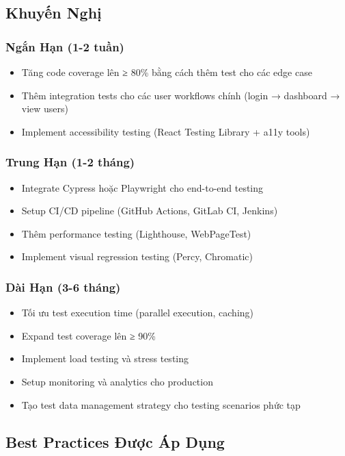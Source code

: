 \documentclass[12pt,a4paper,vietnamese]{article}
\begin{document}
\subsection{Khuyến Nghị}

\subsubsection{Ngắn Hạn (1-2 tuần)}
\begin{itemize}
    \item Tăng code coverage lên ≥ 80\% bằng cách thêm test cho các edge case
    \item Thêm integration tests cho các user workflows chính (login → dashboard → view users)
    \item Implement accessibility testing (React Testing Library + a11y tools)
\end{itemize}

\subsubsection{Trung Hạn (1-2 tháng)}
\begin{itemize}
    \item Integrate Cypress hoặc Playwright cho end-to-end testing
    \item Setup CI/CD pipeline (GitHub Actions, GitLab CI, Jenkins)
    \item Thêm performance testing (Lighthouse, WebPageTest)
    \item Implement visual regression testing (Percy, Chromatic)
\end{itemize}

\subsubsection{Dài Hạn (3-6 tháng)}
\begin{itemize}
    \item Tối ưu test execution time (parallel execution, caching)
    \item Expand test coverage lên ≥ 90\%
    \item Implement load testing và stress testing
    \item Setup monitoring và analytics cho production
    \item Tạo test data management strategy cho testing scenarios phức tạp
\end{itemize}

\subsection{Best Practices Được Áp Dụng}
\end{document}

